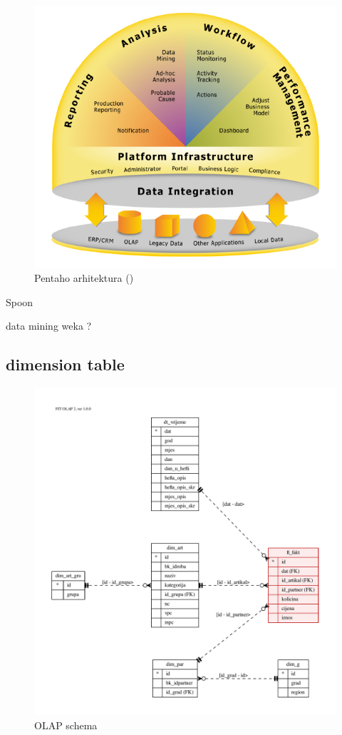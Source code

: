 \documentclass[times, utf8, seminar]{fit}
\begin{document}
\begin{figure}[h]
\centering
\includegraphics[width=15cm]{img/pentaho_arhitektura_eric.png}
\caption{Pentaho arhitektura (\cite{web:eric})}
\end{figure}



Spoon

data mining weka ?


\subsection{dimension table}

\begin{figure}[h]
\centering
\includegraphics[width=15cm]{img/F18_olap.pdf}
\caption{OLAP schema}
\end{figure}
\end{document}
